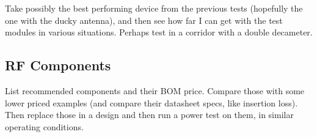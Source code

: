 Take possibly the best performing device from the previous tests (hopefully the
one with the ducky antenna), and then see how far I can get with the test
modules in various situations. Perhaps test in a corridor with a double
decameter.

\subsection{RF Components}

List recommended components and their BOM price. Compare those with some lower
priced examples (and compare their datasheet specs, like insertion loss). Then
replace those in a design and then run a power test on them, in similar
operating conditions.



